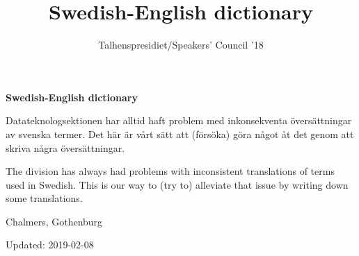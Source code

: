 \documentclass[a4paper]{dtek}
\title{Swedish-English dictionary}
\author{Talhenspresidiet/Speakers' Council '18}
\newcommand{\updated}{2019-02-08} %
\begin{document}
\makeheadfoot

\vspace*{\fill}
\begin{center}
{\Huge \textbf{Swedish-English dictionary}}
\par\bigskip

        Datateknologsektionen har alltid haft problem med inkonsekventa översättningar
        av svenska termer. Det här är vårt sätt att (försöka) göra något åt det genom
        att skriva några översättningar.

        The division has always had problems with inconsistent translations
        of terms used in Swedish. This is our way to (try to) alleviate that issue
        by writing down some translations.


\par\bigskip
{\LARGE Chalmers, Gothenburg}
\end{center}
\vspace*{\fill}
\begin{center}
{\LARGE Updated: \updated}
\end{center}
\vspace*{\fill}


\newpage
\tableofcontents

\newpage
{}
\setcounter{page}{2}
\end{document}
